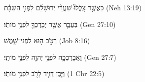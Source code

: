 
\begin{exe}

\ex\label{ant_gp_exs1}
\texthebrew{
כַּאֲשֶׁ֣ר צָֽלֲלוּ֩ שַׁעֲרֵ֨י יְרוּשָׁלִַ֜ם לִפְנֵ֣י הַשַּׁבָּ֗ת 
} (Neh 13:19)

\ex\label{ant_gp_exs2}
\texthebrew{
בַּעֲבֻ֛ר אֲשֶׁ֥ר יְבָרֶכְךָ֖ לִפְנֵ֥י מֹותֹֽו׃ 
} (Gen 27:10)

\ex\label{ant_gp_exs3}
\texthebrew{
רָטֹ֣ב ה֖וּא לִפְנֵי־שָׁ֑מֶשׁ 
} (Job 8:16)

\ex\label{ant_gp_exs4}
\texthebrew{
וַאֲבָרֶכְכָ֛ה לִפְנֵ֥י יְהוָ֖ה לִפְנֵ֥י מֹותִֽי׃ 
} (Gen 27:7)

\ex\label{ant_gp_exs5}
\texthebrew{
וַיָּ֧כֶן דָּוִ֛יד לָרֹ֖ב לִפְנֵ֥י מֹותֹֽו׃ 
} (1 Chr 22:5)

\end{exe}
